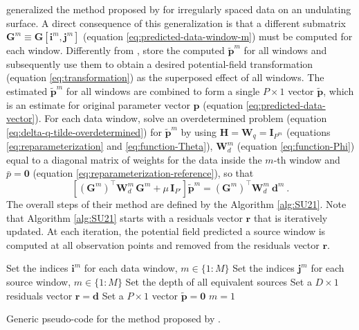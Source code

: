 \cite{soler-uieda2021} generalized the method proposed by \cite{leao-silva1989} for irregularly spaced data on an undulating surface.
A direct consequence of this generalization is that a different submatrix $\mathbf{G}^{m} \equiv \mathbf{G}[\mathbf{i}^{m}, \mathbf{j}^{m}]$ 
(equation \ref{eq:predicted-data-window-m}) must be computed for each window.
Differently from \cite{leao-silva1989}, \cite{soler-uieda2021} store the computed $\tilde{\mathbf{p}}^{m}$ for all windows and
subsequently use them to obtain a desired potential-field transformation (equation \ref{eq:transformation}) as the superposed
effect of all windows.
The estimated $\tilde{\mathbf{p}}^{m}$ for all windows are combined to form a single $P \times 1$ vector $\tilde{\mathbf{p}}$,
which is an estimate for original parameter vector $\mathbf{p}$ (equation \ref{eq:predicted-data-vector}).
For each data window, \cite{soler-uieda2021} solve an overdetermined problem (equation \ref{eq:delta-q-tilde-overdetermined}) 
for $\tilde{\mathbf{p}}^{m}$ by using 
$\mathbf{H} = \mathbf{W}_{q} = \mathbf{I}_{P^{m}}$ (equations \ref{eq:reparameterization} and \ref{eq:function-Theta}),
$\mathbf{W}^{m}_{d}$ (equation \ref{eq:function-Phi}) equal to a diagonal matrix of weights for the data inside the $m$-th window
and $\bar{p} = \mathbf{0}$ (equation \ref{eq:reparameterization-reference}), so that
\begin{equation}
	\left[ \left( \mathbf{G}^{m} \right)^{\top} \mathbf{W}^{m}_{d} \, \mathbf{G}^{m} + 
	\mu \, \mathbf{I}_{P'} \right] 
	\tilde{\mathbf{p}}^{m} = 
	\left( \mathbf{G}^{m} \right)^{\top} \mathbf{W}^{m}_{d} \: 
	\mathbf{d}^{m} \: .
	\label{eq:p-tilde-m-SU21}
\end{equation}
The overall steps of their method are defined by the Algorithm \ref{alg:SU21}.
Note that Algorithm \ref{alg:SU21} starts with a residuals vector $\mathbf{r}$ that is iteratively updated.
At each iteration, the potential field predicted a source window is computed at all observation points and removed from the
residuals vector $\mathbf{r}$.

\begin{algorithm}
	\Input{}
	Set the indices $\mathbf{i}^{m}$ for each data window, $m \in \{ 1 : M \}$ \;
	Set the indices $\mathbf{j}^{m}$ for each source window, $m \in \{ 1 : M \}$ \;
	Set the depth of all equivalent sources \;
	Set a $D \times 1$ residuals vector $\mathbf{r} = \mathbf{d}$ \;
	Set a $P \times 1$ vector $\tilde{\mathbf{p}} = \mathbf{0}$ \;
	$m = 1$ \;
	\caption{Generic pseudo-code for the method proposed by \cite{soler-uieda2021}.}
	\label{alg:SU21}
\end{algorithm}


